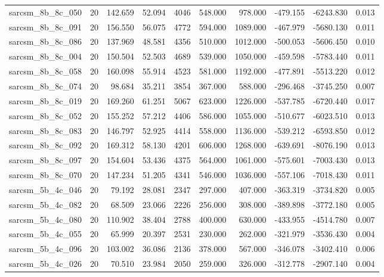 \begin{tabular}{lrrrrrrrrr}
sarcsm\_8b\_8c\_050 & 20 & 142.659 & 52.094 & 4046 & 548.000 & 978.000 & -479.155 & -6243.830 & 0.013 \\
sarcsm\_8b\_8c\_091 & 20 & 156.550 & 56.075 & 4772 & 594.000 & 1089.000 & -467.979 & -5680.130 & 0.011 \\
sarcsm\_8b\_8c\_086 & 20 & 137.969 & 48.581 & 4356 & 510.000 & 1012.000 & -500.053 & -5606.450 & 0.010 \\
sarcsm\_8b\_8c\_004 & 20 & 150.504 & 52.503 & 4689 & 539.000 & 1050.000 & -459.598 & -5783.440 & 0.011 \\
sarcsm\_8b\_8c\_058 & 20 & 160.098 & 55.914 & 4523 & 581.000 & 1192.000 & -477.891 & -5513.220 & 0.012 \\
sarcsm\_8b\_8c\_074 & 20 & 98.684 & 35.211 & 3854 & 367.000 & 588.000 & -296.468 & -3745.250 & 0.007 \\
sarcsm\_8b\_8c\_019 & 20 & 169.260 & 61.251 & 5067 & 623.000 & 1226.000 & -537.785 & -6720.440 & 0.017 \\
sarcsm\_8b\_8c\_052 & 20 & 155.252 & 57.212 & 4406 & 586.000 & 1055.000 & -510.677 & -6023.510 & 0.013 \\
sarcsm\_8b\_8c\_083 & 20 & 146.797 & 52.925 & 4414 & 558.000 & 1136.000 & -539.212 & -6593.850 & 0.012 \\
sarcsm\_8b\_8c\_092 & 20 & 169.312 & 58.130 & 4201 & 606.000 & 1268.000 & -639.691 & -8076.190 & 0.013 \\
sarcsm\_8b\_8c\_097 & 20 & 154.604 & 53.436 & 4375 & 564.000 & 1061.000 & -575.601 & -7003.430 & 0.013 \\
sarcsm\_8b\_8c\_070 & 20 & 147.234 & 51.205 & 4341 & 546.000 & 1036.000 & -557.106 & -7018.430 & 0.011 \\
sarcsm\_5b\_4c\_046 & 20 & 79.192 & 28.081 & 2347 & 297.000 & 407.000 & -363.319 & -3734.820 & 0.005 \\
sarcsm\_5b\_4c\_082 & 20 & 68.509 & 23.066 & 2226 & 256.000 & 308.000 & -389.898 & -3772.180 & 0.005 \\
sarcsm\_5b\_4c\_080 & 20 & 110.902 & 38.404 & 2788 & 400.000 & 630.000 & -433.955 & -4514.780 & 0.007 \\
sarcsm\_5b\_4c\_055 & 20 & 65.999 & 20.397 & 2531 & 230.000 & 262.000 & -321.979 & -3536.430 & 0.004 \\
sarcsm\_5b\_4c\_096 & 20 & 103.002 & 36.086 & 2136 & 378.000 & 567.000 & -346.078 & -3402.410 & 0.006 \\
sarcsm\_5b\_4c\_026 & 20 & 70.510 & 23.984 & 2050 & 259.000 & 326.000 & -312.778 & -2907.140 & 0.004 \\

\end{tabular}
